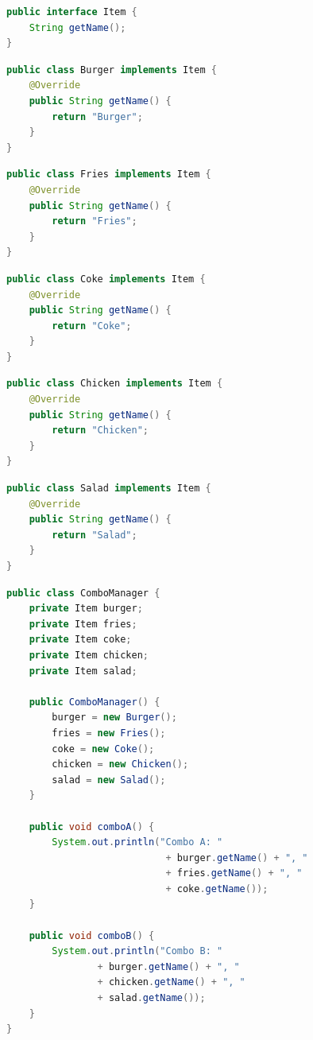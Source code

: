 \vspace{0.5cm}

\begin{lstlisting}[language=Java, title=Item.java]
public interface Item {
    String getName();
}    
\end{lstlisting}

\begin{lstlisting}[language=Java, title=Burger.java]
public class Burger implements Item {
    @Override
    public String getName() {
        return "Burger";
    }
}
\end{lstlisting}

\begin{lstlisting}[language=Java, title=Fries.java]
public class Fries implements Item {
    @Override
    public String getName() {
        return "Fries";
    }
}
\end{lstlisting}

\begin{lstlisting}[language=Java, title=Coke.java]
public class Coke implements Item {
    @Override
    public String getName() {
        return "Coke";
    }
}
\end{lstlisting}

\begin{lstlisting}[language=Java, title=Chicken.java]
public class Chicken implements Item {
    @Override
    public String getName() {
        return "Chicken";
    }
}
\end{lstlisting}

\begin{lstlisting}[language=Java, title=Salad.java]
public class Salad implements Item {
    @Override
    public String getName() {
        return "Salad";
    }
}
\end{lstlisting}

\begin{lstlisting}[language=Java, title=ComboManager.java]
public class ComboManager {
    private Item burger;
    private Item fries;
    private Item coke;
    private Item chicken;
    private Item salad;

    public ComboManager() {
        burger = new Burger();
        fries = new Fries();
        coke = new Coke();
        chicken = new Chicken();
        salad = new Salad();
    }

    public void comboA() {
        System.out.println("Combo A: "
                            + burger.getName() + ", "
                            + fries.getName() + ", "
                            + coke.getName());
    }

    public void comboB() {
        System.out.println("Combo B: "
                + burger.getName() + ", "
                + chicken.getName() + ", "
                + salad.getName());
    }
}
\end{lstlisting}

